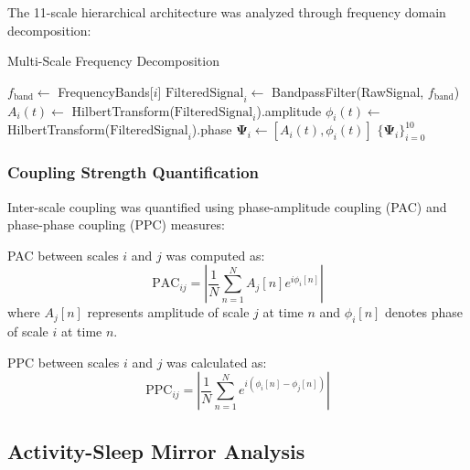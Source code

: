 The 11-scale hierarchical architecture was analyzed through frequency domain decomposition:

\begin{algorithm}
\caption{Multi-Scale Frequency Decomposition}
\begin{algorithmic}
        \State $f_{\text{band}} \leftarrow$ FrequencyBands[$i$]
        \State $\text{FilteredSignal}_i \leftarrow$ BandpassFilter(RawSignal, $f_{\text{band}}$)
        \State $A_i(t) \leftarrow$ HilbertTransform($\text{FilteredSignal}_i$).amplitude
        \State $\phi_i(t) \leftarrow$ HilbertTransform($\text{FilteredSignal}_i$).phase
        \State $\mathbf{\Psi}_i \leftarrow [A_i(t), \phi_i(t)]$
    \EndFor
    \State \Return $\{\mathbf{\Psi}_i\}_{i=0}^{10}$
\EndProcedure
\end{algorithmic}
\end{algorithm}

\subsubsection{Coupling Strength Quantification}

Inter-scale coupling was quantified using phase-amplitude coupling (PAC) and phase-phase coupling (PPC) measures:

\begin{definition}
PAC between scales $i$ and $j$ was computed as:
\begin{equation}
\text{PAC}_{ij} = \left| \frac{1}{N} \sum_{n=1}^{N} A_j[n] e^{i\phi_i[n]} \right|
\end{equation}
where $A_j[n]$ represents amplitude of scale $j$ at time $n$ and $\phi_i[n]$ denotes phase of scale $i$ at time $n$.
\end{definition}

\begin{definition}
PPC between scales $i$ and $j$ was calculated as:
\begin{equation}
\text{PPC}_{ij} = \left| \frac{1}{N} \sum_{n=1}^{N} e^{i(\phi_i[n] - \phi_j[n])} \right|
\end{equation}
\end{definition}

\subsection{Activity-Sleep Mirror Analysis}


